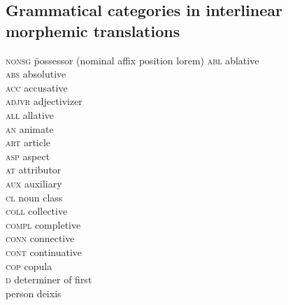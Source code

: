 \begin{refsection}

\section*{Grammatical categories in interlinear morphemic translations}

\begin{multicols}{2}
\setlength{\parindent}{0pt}
\begin{tabbing}
\textsc{nonsg} \= possessor (nominal affix position lorem) \kill
	\textsc{abl} \>  ablative\\
	
	\textsc{abs} \>  absolutive\\
	
	\textsc{acc} \>  accusative\\
	
	\textsc{adjvr} \>  adjectivizer\\
	
	\textsc{all} \>  allative\\
	
	\textsc{an} \>  animate\\
	
	\textsc{art} \>  article\\
	
	\textsc{asp} \>  aspect\\
	
	\textsc{at} \>  attributor\\
	
	\textsc{aux} \>  auxiliary\\
	
	\textsc{cl} \>  noun class\\
	
	\textsc{coll} \>  collective\\
	
	\textsc{compl} \>  completive\\
	
	\textsc{conn} \>  connective\\
	
	\textsc{cont} \>  continuative\\
	
	\textsc{cop} \>  copula\\
	
	\textsc{d} \>  determiner of first \\
	
	\> person deixis\\
	

\end{tabbing}
\end{multicols}
\end{refsection}
